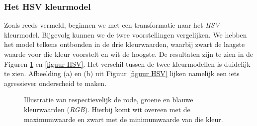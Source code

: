 \documentclass[a4paper,kulak]{kulakarticle}
\begin{document}
\subsubsection{Het HSV kleurmodel}
Zoals reeds vermeld, beginnen we met een transformatie naar het \textit{HSV} kleurmodel. Bijgevolg kunnen we de twee voorstellingen vergelijken. We hebben het model telkens ontbonden in de drie kleurwaarden, waarbij zwart de laagste waarde voor die kleur voorstelt en wit de hoogste. De resultaten zijn te zien in de Figuren \ref{figuur RGB} en \ref{figuur HSV}. Het verschil tussen de twee kleurmodellen is duidelijk te zien. Afbeelding (a) en (b) uit Figuur \ref{figuur HSV} lijken namelijk een iets agressiever onderscheid te maken.

\begin{figure}[H]
	\centering
	\qquad
	\qquad
	\caption{Illustratie van respectievelijk de rode, groene en blauwe kleurwaarden (\textit{RGB}). Hierbij komt wit overeen met de maximumwaarde en zwart met de minimumwaarde van die kleur.}
	\label{figuur RGB}
\end{figure}
\end{document}
